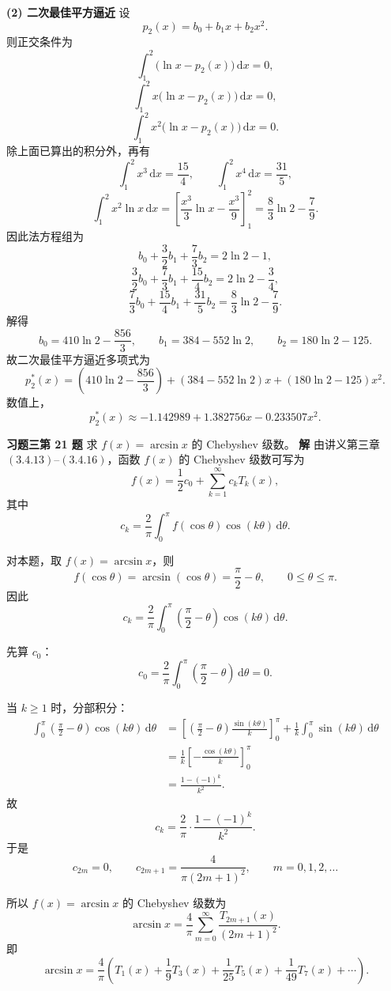 \documentclass[UTF8,a4paper,11pt]{ctexart}
\begin{document}
\medskip
\noindent\textbf{(2) 二次最佳平方逼近}\quad
设
\[
  p_2(x)=b_0+b_1x+b_2x^2.
\]
则正交条件为
\[
  \int_1^2 \bigl(\ln x-p_2(x)\bigr)\,\mathrm{d}x=0,
\]
\[
  \int_1^2 x\bigl(\ln x-p_2(x)\bigr)\,\mathrm{d}x=0,
\]
\[
  \int_1^2 x^2\bigl(\ln x-p_2(x)\bigr)\,\mathrm{d}x=0.
\]
除上面已算出的积分外，再有
\[
  \int_1^2 x^3\,\mathrm{d}x=\frac{15}{4},\qquad
  \int_1^2 x^4\,\mathrm{d}x=\frac{31}{5},
\]
\[
  \int_1^2 x^2\ln x\,\mathrm{d}x
  =\left[\frac{x^3}{3}\ln x-\frac{x^3}{9}\right]_1^2
  =\frac{8}{3}\ln2-\frac{7}{9}.
\]
因此法方程组为
\[
  b_0+\frac{3}{2}b_1+\frac{7}{3}b_2=2\ln2-1,
\]
\[
  \frac{3}{2}b_0+\frac{7}{3}b_1+\frac{15}{4}b_2=2\ln2-\frac{3}{4},
\]
\[
  \frac{7}{3}b_0+\frac{15}{4}b_1+\frac{31}{5}b_2=\frac{8}{3}\ln2-\frac{7}{9}.
\]
解得
\[
  b_0=410\ln2-\frac{856}{3},\qquad
  b_1=384-552\ln2,\qquad
  b_2=180\ln2-125.
\]
故二次最佳平方逼近多项式为
\[
  \boxed{
  p_2^*(x)=\left(410\ln2-\frac{856}{3}\right)
  +(384-552\ln2)x
  +(180\ln2-125)x^2.}
\]
数值上，
\[
  p_2^*(x)\approx -1.142989+1.382756x-0.233507x^2.
\]

\bigskip\bigskip

\noindent\textbf{习题三\quad 第 21 题}\quad
求 $f(x)=\arcsin x$ 的 Chebyshev 级数。
\medskip
\noindent\textbf{解}\quad
由讲义第三章 $(3.4.13)$--$(3.4.16)$，函数 $f(x)$ 的 Chebyshev 级数可写为
\[
  f(x)=\frac{1}{2}c_0+\sum_{k=1}^{\infty} c_k T_k(x),
\]
其中
\[
  c_k=\frac{2}{\pi}\int_0^{\pi} f(\cos\theta)\cos(k\theta)\,\mathrm{d}\theta.
\]

对本题，取 $f(x)=\arcsin x$，则
\[
  f(\cos\theta)=\arcsin(\cos\theta)=\frac{\pi}{2}-\theta,\qquad 0\le \theta\le \pi.
\]
因此
\[
  c_k=\frac{2}{\pi}\int_0^{\pi}\left(\frac{\pi}{2}-\theta\right)\cos(k\theta)\,\mathrm{d}\theta.
\]

先算 $c_0$：
\[
  c_0=\frac{2}{\pi}\int_0^{\pi}\left(\frac{\pi}{2}-\theta\right)\,\mathrm{d}\theta=0.
\]

当 $k\ge 1$ 时，分部积分：
\begin{align*}
  \int_0^{\pi}\left(\frac{\pi}{2}-\theta\right)\cos(k\theta)\,\mathrm{d}\theta
  &=\left[\left(\frac{\pi}{2}-\theta\right)\frac{\sin(k\theta)}{k}\right]_0^{\pi}
    +\frac{1}{k}\int_0^{\pi}\sin(k\theta)\,\mathrm{d}\theta \\
  &=\frac{1}{k}\left[-\frac{\cos(k\theta)}{k}\right]_0^{\pi} \\
  &=\frac{1-(-1)^k}{k^2}.
\end{align*}
故
\[
  c_k=\frac{2}{\pi}\cdot\frac{1-(-1)^k}{k^2}.
\]
于是
\[
  c_{2m}=0,\qquad
  c_{2m+1}=\frac{4}{\pi(2m+1)^2},\qquad m=0,1,2,\ldots
\]

所以 $f(x)=\arcsin x$ 的 Chebyshev 级数为
\[
  \boxed{
  \arcsin x=\frac{4}{\pi}\sum_{m=0}^{\infty}\frac{T_{2m+1}(x)}{(2m+1)^2}.}
\]
即
\[
  \arcsin x=\frac{4}{\pi}\left(T_1(x)+\frac{1}{9}T_3(x)+\frac{1}{25}T_5(x)+\frac{1}{49}T_7(x)+\cdots\right).
\]
\end{document}
